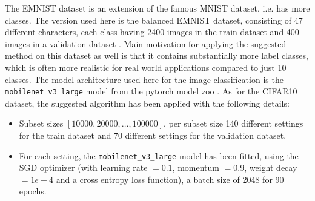 \documentclass{article} %
\begin{document}
The EMNIST dataset is an extension of the famous MNIST dataset, i.e. has more classes. The version used here is the balanced EMNIST dataset, consisting of 47 different characters, each class having 2400 images in the train dataset and 400 images in a validation dataset \cite{cohen2017emnist}.  
Main motivation for applying the suggested method on this dataset as well is that it contains substantially more label classes, which is often more realistic for real world applications compared to just 10 classes.
The model architecture used here for the image classification is the \verb|mobilenet_v3_large| model from the pytorch model zoo \cite{howard2019mobilenetv3}.
As for the CIFAR10 dataset, the suggested algorithm has been applied with the following details:
\begin{itemize}
    \item Subset sizes $[10000, 20000, \dots, 100000]$, per subset size 140 different settings for the train dataset and 70 different settings for the validation dataset.
    \item For each setting, the \verb|mobilenet_v3_large| model has been fitted, using the SGD optimizer (with learning rate $=0.1$, momentum $=0.9$, weight decay $=1e-4$ and a cross entropy loss function), a batch size of 2048 for 90 epochs. 
\end{itemize}
\end{document}
